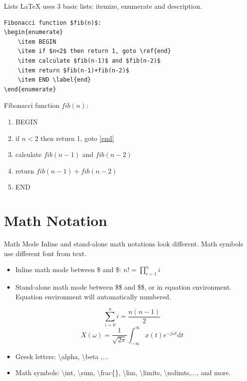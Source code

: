\documentclass[10pt]{beamer}
\begin{document}
\begin{frame}[fragile]{Lists}
    \LaTeX{} uses 3 basic lists: itemize, enumerate and description.

\begin{verbatim}
Fibonacci function $fib(n)$:
\begin{enumerate}
    \item BEGIN
    \item if $n<2$ then return 1, goto \ref{end}
    \item calculate $fib(n-1)$ and $fib(n-2)$
    \item return $fib(n-1)+fib(n-2)$
    \item END \label{end}
\end{enumerate}
\end{verbatim}

\begin{boxedminipage}{0.8\textwidth}
    Fibonacci function $fib(n)$:
\begin{enumerate}
    \item BEGIN
    \item if $n<2$ then return 1, goto \ref{end}
    \item calculate $fib(n-1)$ and $fib(n-2)$
    \item return $fib(n-1)+fib(n-2)$
    \item END \label{end}
\end{enumerate}
    \end{boxedminipage}
\end{frame}

\section{Math Notation}
\begin{frame}{Math Mode}
    Inline and stand-alone math notations look different. Math symbols
    use different font from text.
\begin{itemize}
    \item Inline math mode between \$ and \$: $n!=\prod_{i=1}^n i$
    \item Stand-alone math mode between \$\$ and \$\$, or in
        \alert{equation} environment. Equation environment will
		automatically numbered.

		\begin{equation}\label{equ:xxx}
            \sum_{i=0}^n i = \frac{n (n-1)}{2} \nonumber
        \end{equation}
        \begin{equation}
            X(\omega) =\frac{1}{\sqrt{2\pi}} \int_{-\infty}^{\infty}
                x(t) e^{-j\omega t}\mathrm{d} t
        \end{equation}
    \item Greek letters: \textbackslash alpha, \textbackslash beta ,...
    \item Math symbols: \textbackslash int, \textbackslash sum,
        \textbackslash frac\{\}, \textbackslash lim,
        \textbackslash limits, \textbackslash nolimts,..., and more.

\end{itemize}
\end{frame}
\end{document}
